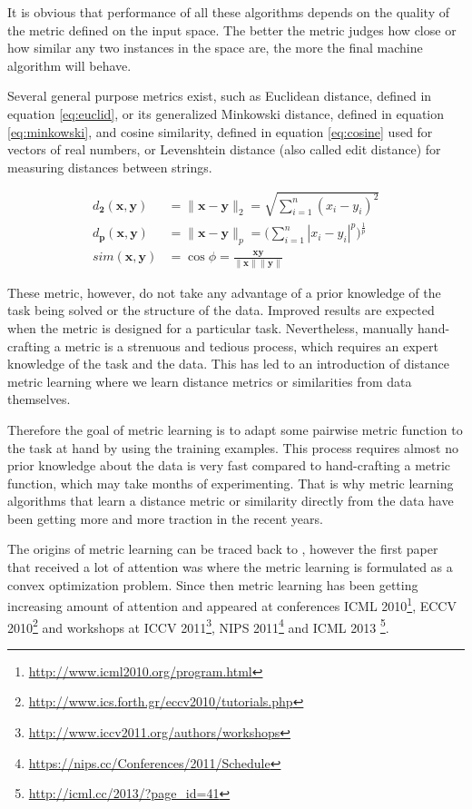 \documentclass[12pt,a4paper]{report}
\begin{document}
It is obvious that performance of all these algorithms depends on the quality of the metric defined on the input space. The better the metric judges how close or how similar any two instances in the space are, the more the final machine algorithm will behave.

Several general purpose metrics exist, such as Euclidean distance, defined in equation \ref{eq:euclid}, or its generalized Minkowski distance, defined in equation \ref{eq:minkowski}, and cosine similarity, defined in equation \ref{eq:cosine} used for vectors of real numbers, or Levenshtein distance (also called edit distance) for measuring distances between strings.

\begin{align}
d_{\mathbf{2}}(\textbf{x}, \textbf{y}) &= \|\textbf{x}-\textbf{y}\|_2 = \sqrt{\sum_{i=1}^{n} (x_i-y_i)^2} \label{eq:euclid} \\
d_{\mathbf{p}}(\textbf{x}, \textbf{y}) &= \|\textbf{x}-\textbf{y}\|_p = \bigg(\sum_{i=1}^{n} |x_i-y_i|^p\bigg)^\frac{1}{p} \label{eq:minkowski} \\
sim(\textbf{x}, \textbf{y}) &= \cos{\phi} = \frac{\textbf{x}\textbf{y}}{\|\textbf{x}\|\|\textbf{y}\|} \label{eq:cosine}
\end{align}

These metric, however, do not take any advantage of a prior knowledge of the task being solved or the structure of the data. Improved results are expected when the metric is designed for a particular task. Nevertheless, manually hand-crafting a metric is a strenuous and tedious process, which requires an expert knowledge of the task and the data. This has led to an introduction of distance metric learning where we learn distance metrics or similarities from data themselves.

Therefore the goal of metric learning is to adapt some pairwise metric function to the task at hand by using the training examples. This process requires almost no prior knowledge about the data is very fast compared to hand-crafting a metric function, which may take months of experimenting. That is why metric learning algorithms that learn a distance metric or similarity directly from the data have been getting more and more traction in the recent years.

The origins of metric learning can be traced back to \cite{short1981optimal}, however the first paper that received a lot of attention was \cite{xing2002distance} where the metric learning is formulated as a convex optimization problem. Since then metric learning has been getting increasing amount of attention and appeared at conferences ICML 2010\footnote{\url{http://www.icml2010.org/program.html}}, ECCV 2010\footnote{\url{http://www.ics.forth.gr/eccv2010/tutorials.php}} and workshops at ICCV 2011\footnote{\url{http://www.iccv2011.org/authors/workshops}}, NIPS 2011\footnote{\url{https://nips.cc/Conferences/2011/Schedule}} and ICML 2013 \footnote{\url{http://icml.cc/2013/?page_id=41}}.
\end{document}
